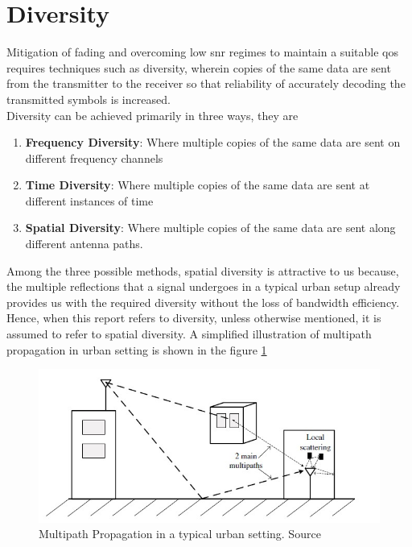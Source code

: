 \section{Diversity}
Mitigation of fading and overcoming low \acrshort{snr} regimes to maintain a suitable \acrshort{qos} requires techniques such as diversity, wherein copies of the same data are sent from the transmitter to the receiver so that reliability of accurately decoding the transmitted symbols is increased.\\
Diversity can be achieved primarily in three ways, they are
\begin{enumerate}
\item \textbf{Frequency Diversity}: Where multiple copies of the same data are sent on different frequency channels
\item \textbf{Time Diversity}: Where multiple copies of the same data are sent at different instances of time
\item \textbf{Spatial Diversity}: Where multiple copies of the same data are sent along different antenna paths.
\end{enumerate}
Among the three possible methods, \gls{spatial diversity} is attractive to us because, the multiple reflections that a signal undergoes in a typical urban setup already provides us with the required diversity without the loss of bandwidth efficiency. Hence, when this report refers to diversity, unless otherwise mentioned, it is assumed to refer to \gls{spatial diversity}. A simplified illustration of multipath propagation in urban setting is shown in the figure \ref{fig:multipath propagation}\\
\begin{figure}[!htbp]
\centering
\includegraphics[scale=1]{Chapter 2/Figures/Multipath Propagation}
\caption[Multipath Propagation in a typical urban setting]{Multipath Propagation in a typical urban setting. Source \textcite{Ghosh2010}}
\label{fig:multipath propagation}
\end{figure}
